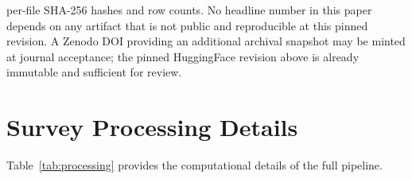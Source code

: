 \documentclass[aps,prd,twocolumn,superscriptaddress,showpacs,preprintnumbers,nofootinbib,longbibliography,floatfix]{revtex4-2}
\begin{document}
\begin{acknowledgments}
per-file SHA-256 hashes and row counts. No headline number in this paper depends on any artifact that is not public and reproducible at this pinned revision. A Zenodo DOI providing an additional archival snapshot may be minted at journal acceptance; the pinned HuggingFace revision above is already immutable and sufficient for review.\end{acknowledgments}


\appendix

\section{Survey Processing Details}\label{app:processing}

Table~\ref{tab:processing} provides the computational details of the full pipeline.
\end{document}
